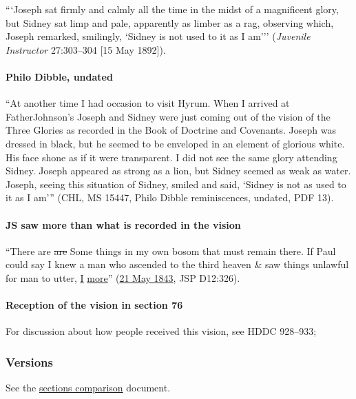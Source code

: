 			```Joseph sat firmly and calmly all the time in the midst of a magnificent glory, but Sidney sat limp and pale, apparently as limber as a rag, observing which, Joseph remarked, smilingly, `Sidney is not used to it as I am''' (\textit{Juvenile Instructor} 27:303--304 [15 May 1892]).
			
		\paragraph{Philo Dibble, undated}
		
			``At another time I had occasion to visit Hyrum. When I arrived at FatherJohnson's Joseph and Sidney were just coming out of the vision of the Three Glories as recorded in the Book of Doctrine and Covenants. Joseph was dressed in black, but he seemed to be enveloped in an element of glorious white. His face shone as if it were transparent. I did not see the same glory attending Sidney. Joseph appeared as strong as a lion, but Sidney seemed as weak as water. Joseph, seeing this situation of Sidney, smiled and said, `Sidney is not as used to it as I am''' (CHL, MS 15447, Philo Dibble reminiscences, undated, PDF 13).
			
		\paragraph{JS saw more than what is recorded in the vision}
		
			``There are \sout{are} Some things in my own bosom that must remain there. If Paul could say I knew a man who ascended to the third heaven \& saw things unlawful for man to utter, \uline{I} \uline{more}'' (\hyperref[EMS-1843-JS-21-MAY-1843-HC]{21 May 1843}, JSP D12:326).
			
		\paragraph{Reception of the vision in section 76}
		
			For discussion about how people received this vision, see HDDC 928--933;
		
	\subsubsection{Versions}
		\label{DC76-V}
		
		See the \href{https://drive.google.com/file/d/1goAvNz8jS4R8slYfMG_db55Ty2z_vmgK/view?usp=sharing}{sections comparison} document.
	
